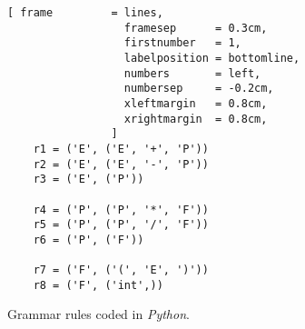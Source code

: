 \begin{table}[!ht]
  \centering
{}
  \caption{The function $\textsl{goto}()$.}
  \label{tab:goto}
\end{table}


\begin{figure}[!ht]
\centering
\begin{Verbatim}[ frame         = lines, 
                  framesep      = 0.3cm, 
                  firstnumber   = 1,
                  labelposition = bottomline,
                  numbers       = left,
                  numbersep     = -0.2cm,
                  xleftmargin   = 0.8cm,
                  xrightmargin  = 0.8cm,
                ]
    r1 = ('E', ('E', '+', 'P'))
    r2 = ('E', ('E', '-', 'P'))
    r3 = ('E', ('P'))
    
    r4 = ('P', ('P', '*', 'F'))
    r5 = ('P', ('P', '/', 'F'))
    r6 = ('P', ('F'))
    
    r7 = ('F', ('(', 'E', ')'))
    r8 = ('F', ('int',))               
\end{Verbatim}
\vspace*{-0.3cm}
\caption{Grammar rules coded in \textsl{Python}.}
\label{fig:parse-table.stlx:grammar}
\end{figure}


